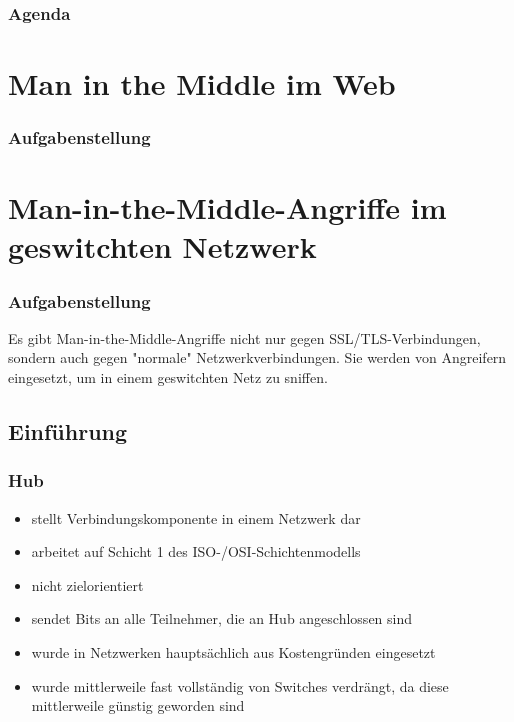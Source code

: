 \documentclass{beamer}
\begin{document}
	\begin{frame} %
		\frametitle{Agenda}
		\tableofcontents
	\end{frame}
	
	\section{Man in the Middle im Web}
	
	\begin{frame}
		\frametitle{Aufgabenstellung}
	
    \end{frame}
    
    \section{Man-in-the-Middle-Angriffe im geswitchten Netzwerk}
    	
    	\begin{frame}
    		\frametitle{Aufgabenstellung}
    		Es gibt Man-in-the-Middle-Angriffe nicht nur gegen SSL/TLS-Verbindungen, sondern auch gegen "normale" Netzwerkverbindungen. Sie werden von Angreifern eingesetzt, um in einem geswitchten Netz zu sniffen.
        \end{frame}
        \subsection*{Einführung}
        \begin{frame}
        	\frametitle{Hub}
            \begin{itemize}
            \item stellt Verbindungskomponente in einem Netzwerk dar
            \item arbeitet auf Schicht 1 des ISO-/OSI-Schichtenmodells
            \item nicht zielorientiert
            \item sendet Bits an alle Teilnehmer, die an Hub angeschlossen sind
            \item wurde in Netzwerken hauptsächlich aus Kostengründen eingesetzt
            \item wurde mittlerweile fast vollständig von Switches verdrängt, da diese mittlerweile günstig geworden sind 
            \end{itemize}
        \end{frame}
        
\end{document}
